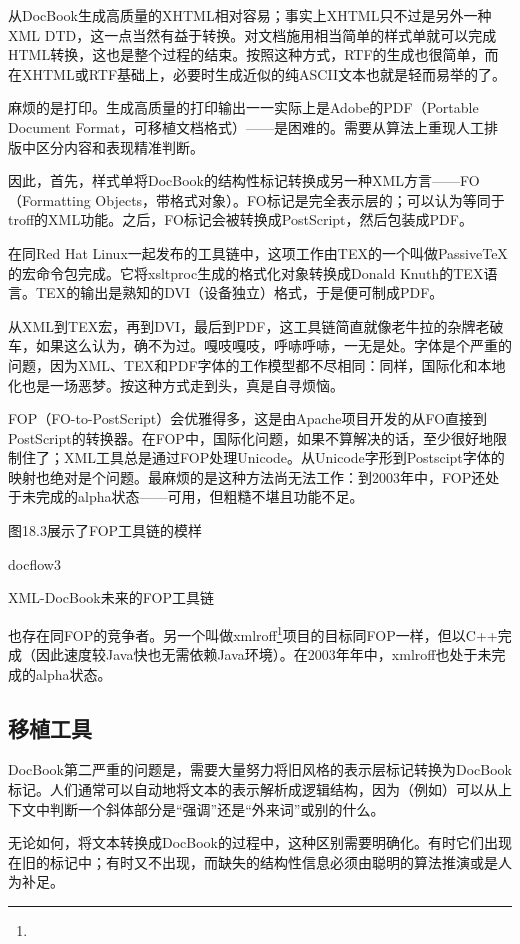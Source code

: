 \documentclass[12pt,oneside]{book}
\begin{document}
\begin{common-format}
从DocBook生成高质量的XHTML相对容易；事实上XHTML只不过是另外一种XML DTD，这一点当然有益于转换。对文档施用相当简单的样式单就可以完成HTML转换，这也是整个过程的结束。按照这种方式，RTF的生成也很简单，而在XHTML或RTF基础上，必要时生成近似的纯ASCII文本也就是轻而易举的了。

麻烦的是打印。生成高质量的打印输出一一实际上是Adobe的PDF（Portable Document Format，可移植文档格式）——是困难的。需要从算法上重现人工排版中区分内容和表现精准判断。

因此，首先，样式单将DocBook的结构性标记转换成另一种XML方言——FO（Formatting Objects，带格式对象）。FO标记是完全表示层的；可以认为等同于troff的XML功能。之后，FO标记会被转换成PostScript，然后包装成PDF。

在同Red Hat Linux一起发布的工具链中，这项工作由TEX的一个叫做PassiveTeX的宏命令包完成。它将xsltproc生成的格式化对象转换成Donald Knuth的TEX语言。TEX的输出是熟知的DVI（设备独立）格式，于是便可制成PDF。

从XML到TEX宏，再到DVI，最后到PDF，这工具链简直就像老牛拉的杂牌老破车，如果这么认为，确不为过。嘎吱嘎吱，呼哧呼哧，一无是处。字体是个严重的问题，因为XML、TEX和PDF字体的工作模型都不尽相同：同样，国际化和本地化也是一场恶梦。按这种方式走到头，真是自寻烦恼。

FOP（FO-to-PostScript）会优雅得多，这是由Apache项目开发的从FO直接到PostScript的转换器。在FOP中，国际化问题，如果不算解决的话，至少很好地限制住了；XML工具总是通过FOP处理Unicode。从Unicode字形到Postscipt字体的映射也绝对是个问题。最麻烦的是这种方法尚无法工作：到2003年中，FOP还处于未完成的alpha状态——可用，但粗糙不堪且功能不足。

图18.3展示了FOP工具链的模样
\begin{fig}{docflow3}
\caption{XML-DocBook未来的FOP工具链}
\label{fig:docflow3}
\end{fig}

也存在同FOP的竞争者。另一个叫做xmlroff\footnote{}项目的目标同FOP一样，但以C++完成（因此速度较Java快也无需依赖Java环境）。在2003年年中，xmlroff也处于未完成的alpha状态。

\subsection{移植工具}
DocBook第二严重的问题是，需要大量努力将旧风格的表示层标记转换为DocBook标记。人们通常可以自动地将文本的表示解析成逻辑结构，因为（例如）可以从上下文中判断一个斜体部分是“强调”还是“外来词”或别的什么。

无论如何，将文本转换成DocBook的过程中，这种区别需要明确化。有时它们出现在旧的标记中；有时又不出现，而缺失的结构性信息必须由聪明的算法推演或是人为补足。


\end{common-format}
\end{document}
